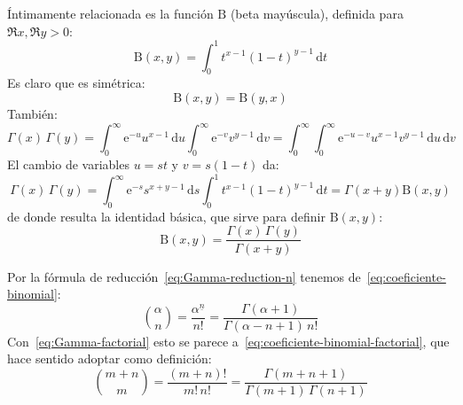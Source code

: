   Íntimamente relacionada es la función \(\mathrm{B}\)
  (beta mayúscula),%
  definida para \(\Re x, \Re y > 0\):
  \begin{equation}
    \label{eq:definition-Beta}
    \mathrm{B}(x, y)
      = \int_0^1 t^{x - 1} (1 - t)^{y - 1} \, \mathrm{d} t
  \end{equation}
  Es claro que es simétrica:
  \begin{equation}
    \label{eq:Beta-symmetry}
    \mathrm{B}(x, y)
      = \mathrm{B}(y, x)
  \end{equation}
  También:
  \begin{equation*}
    \Gamma(x) \, \Gamma(y)
      = \int_0^\infty \mathrm{e}^{-u} u^{x - 1} \, \mathrm{d} u
	  \int_0^\infty \mathrm{e}^{-v} v^{y - 1} \, \mathrm{d} v
      = \int_0^\infty \int_0^\infty
	  \mathrm{e}^{-u - v} u^{x - 1} v^{y - 1}
	     \, \mathrm{d} u \, \mathrm{d} v
  \end{equation*}
  El cambio de variables \(u = s t\) y \(v = s (1 - t)\) da:
  \begin{equation*}
    \Gamma(x) \, \Gamma(y)
      = \int_0^\infty \mathrm{e}^{-s} s^{x + y - 1} \, \mathrm{d} s
	  \int_0^1 t^{x - 1} (1 - t)^{y - 1} \, \mathrm{d} t
      = \Gamma(x + y) \mathrm{B}(x, y)
  \end{equation*}
  de donde resulta la identidad básica,
  que sirve para definir \(\mathrm{B}(x, y)\):
  \begin{equation}
    \label{eq:Gamma-Beta}
    \mathrm{B}(x, y)
      = \frac{\Gamma(x) \, \Gamma(y)}{\Gamma(x + y)}
  \end{equation}

  Por la fórmula de reducción~\eqref{eq:Gamma-reduction-n}%
  tenemos de~\eqref{eq:coeficiente-binomial}:%
  \begin{equation*}
    \binom{\alpha}{n}
      = \frac{\alpha^{\underline{n}}}{n!}
      = \frac{\Gamma(\alpha + 1)}{\Gamma(\alpha - n + 1) \, n!}
  \end{equation*}
  Con~\eqref{eq:Gamma-factorial}
  esto se parece a~\eqref{eq:coeficiente-binomial-factorial},
  que hace sentido adoptar como definición:
  \begin{equation}
    \label{eq:complex-binomial-coefficient}
    \binom{m + n}{m}
      = \frac{(m + n)!}{m! \, n!}
      = \frac{\Gamma(m + n + 1)}{\Gamma(m + 1) \, \Gamma(n + 1)}
  \end{equation}

